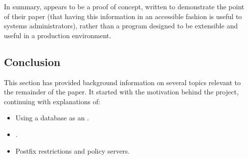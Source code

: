 \documentclass[a4paper,12pt,draft]{article}
\begin{document}
In summary, \LMA{} appears to be a proof of concept, written to demonstrate
the point of their paper (that having this information in an accessible
fashion is useful to systems administrators), rather than a program
designed to be extensible and useful in a production environment.

%

\subsection{Conclusion}

This section has provided background information on several topics relevant
to the remainder of the paper.  It started with the motivation behind the
project, continuing with explanations of:

\begin{itemize}

    \item Using a database as an \API{}.

    \item \SMTP{}.

    \item Postfix restrictions and policy servers.

\end{itemize}
\end{document}
